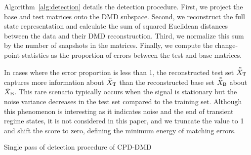 Algorithm~\ref{alg:detection} details the detection procedure. First, we project the base and test matrices onto the DMD subspace. Second, we reconstruct the full state representation and calculate the sum of squared Euclidean distances between the data and their DMD reconstruction. Third, we normalize this sum by the number of snapshots in the matrices. Finally, we compute the change-point statistics as the proportion of errors between the test and base matrices.

In cases where the error proportion is less than 1, the reconstructed test set \(\tilde{\bar{X}} _{\text{T}}\) captures more information about \(\bar{X} _{\text{T}}\) than the reconstructed base set \(\tilde{\bar{X}} _{\text{B}}\) about \(\bar{X} _{\text{B}}\). This rare scenario typically occurs when the signal is stationary but the noise variance decreases in the test set compared to the training set. Although this phenomenon is interesting as it indicates noise and the end of transient regime states, it is not considered in this paper, and we truncate the value to 1 and shift the score to zero, defining the minimum energy of matching errors.

\begin{algorithm}
    \caption{Single pass of detection procedure of CPD-DMD}\label{alg:detection}
    \begin{algorithmic}[1]
    \end{algorithmic}
\end{algorithm}


